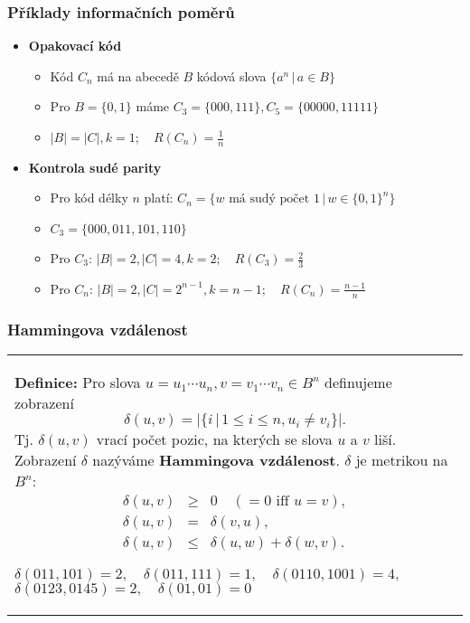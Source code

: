 \documentclass{beamer}
\newenvironment{definice}
{
    \begin{center}
    \begin{tabular}{p{9cm}}
    \textbf{Definice:}
}
{
    \end{tabular}
    \end{center}
}
\newcommand{\sep}{\,|\,}
\newenvironment{itemizex}%
  {\large \begin{itemize}%
    \setlength{\itemsep}{8pt}%
    \setlength{\parskip}{8pt}}%
  {\end{itemize}}
\newenvironment{itemize4}%
  {\large \begin{itemize}%
    \setlength{\itemsep}{4pt}%
    \setlength{\parskip}{4pt}}%
  {\end{itemize}}
\begin{document}
\begin{frame}[t,fragile]\frametitle{Příklady informačních poměrů} 
    \begin{itemizex}
        \item \textbf{Opakovací kód}
        \begin{itemize4}
            \item Kód $C_n$ má na abecedě $B$ kódová slova $\{a^n\sep a\in B\}$
            \item Pro $B=\{0,1\}$ máme $C_3=\{000,111\}, C_5=\{00000,11111\}$
            \item $|B|=|C|, k=1;\quad R(C_n)=\frac{1}{n}$
        \end{itemize4}
        \item \textbf{Kontrola sudé parity}
        \begin{itemize4}
            \item Pro kód délky $n$ platí: $C_n=\{w \mbox{ má sudý počet 1}\sep w\in \{0,1\}^n\}$
            \item $C_3=\{000,011,101,110\}$
            \item Pro $C_3$: $|B|=2, |C|=4, k=2;\quad R(C_3)=\frac23$
            \item Pro $C_n$: $|B|=2, |C|=2^{n-1}, k=n-1;\quad R(C_n)=\frac{n-1}{n}$
        \end{itemize4}
    \end{itemizex}
\end{frame}


\begin{frame}[t,fragile]\frametitle{Hammingova vzdálenost} 
    \begin{definice} Pro slova $u=u_1\cdots u_n, v=v_1\cdots v_n\in B^n$ definujeme zobrazení
    $$
    \delta(u,v) = |\{i\sep 1\le i \le n, u_i\ne v_i\}|.
    $$
    Tj. $\delta(u,v)$ vrací počet pozic, na kterých se slova $u$ a $v$ liší. Zobrazení $\delta$ nazýváme \textbf{Hammingova vzdálenost}. $\delta$ je metrikou na $B^n$:
    \begin{eqnarray*}
    \delta(u,v)&\ge&0\quad (=0 \mbox{ iff } u=v),\\
    \delta(u,v)&=&\delta(v,u),\\
    \delta(u,v)&\le&\delta(u,w)+\delta(w,v).
    \end{eqnarray*}

    $\delta(011,101)=2, \quad \delta(011, 111)=1,\quad \delta(0110, 1001)=4,$ $\delta(0123, 0145)=2, \quad\delta(01,01)=0$
    \end{definice}
\end{frame}
\end{document}
